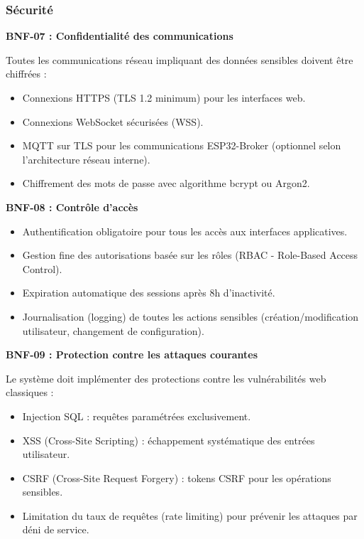 \subsubsection{Sécurité}

\textbf{BNF-07 : Confidentialité des communications}

Toutes les communications réseau impliquant des données sensibles doivent être chiffrées :

\begin{itemize}
    \item Connexions HTTPS (TLS 1.2 minimum) pour les interfaces web.
    \item Connexions WebSocket sécurisées (WSS).
    \item MQTT sur TLS pour les communications ESP32-Broker (optionnel selon l'architecture réseau interne).
    \item Chiffrement des mots de passe avec algorithme bcrypt ou Argon2.
\end{itemize}

\textbf{BNF-08 : Contrôle d'accès}

\begin{itemize}
    \item Authentification obligatoire pour tous les accès aux interfaces applicatives.
    \item Gestion fine des autorisations basée sur les rôles (RBAC - Role-Based Access Control).
    \item Expiration automatique des sessions après 8h d'inactivité.
    \item Journalisation (logging) de toutes les actions sensibles (création/modification utilisateur, changement de configuration).
\end{itemize}

\textbf{BNF-09 : Protection contre les attaques courantes}

Le système doit implémenter des protections contre les vulnérabilités web classiques :

\begin{itemize}
    \item Injection SQL : requêtes paramétrées exclusivement.
    \item XSS (Cross-Site Scripting) : échappement systématique des entrées utilisateur.
    \item CSRF (Cross-Site Request Forgery) : tokens CSRF pour les opérations sensibles.
    \item Limitation du taux de requêtes (rate limiting) pour prévenir les attaques par déni de service.
\end{itemize}


